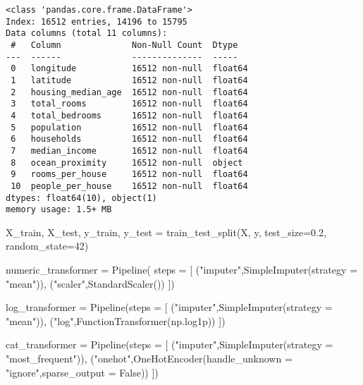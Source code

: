 \documentclass[
  letterpaper,
  DIV=11,
  numbers=noendperiod]{scrartcl}
\newenvironment{Shaded}{\begin{snugshade}}{\end{snugshade}}
\newcommand{\DecValTok}[1]{\textcolor[rgb]{0.68,0.00,0.00}{#1}}
\newcommand{\FloatTok}[1]{\textcolor[rgb]{0.68,0.00,0.00}{#1}}
\newcommand{\NormalTok}[1]{\textcolor[rgb]{0.00,0.23,0.31}{#1}}
\newcommand{\OperatorTok}[1]{\textcolor[rgb]{0.37,0.37,0.37}{#1}}
\newcommand{\StringTok}[1]{\textcolor[rgb]{0.13,0.47,0.30}{#1}}
\newcommand{\VariableTok}[1]{\textcolor[rgb]{0.07,0.07,0.07}{#1}}
\begin{document}
\begin{verbatim}
<class 'pandas.core.frame.DataFrame'>
Index: 16512 entries, 14196 to 15795
Data columns (total 11 columns):
 #   Column              Non-Null Count  Dtype  
---  ------              --------------  -----  
 0   longitude           16512 non-null  float64
 1   latitude            16512 non-null  float64
 2   housing_median_age  16512 non-null  float64
 3   total_rooms         16512 non-null  float64
 4   total_bedrooms      16512 non-null  float64
 5   population          16512 non-null  float64
 6   households          16512 non-null  float64
 7   median_income       16512 non-null  float64
 8   ocean_proximity     16512 non-null  object 
 9   rooms_per_house     16512 non-null  float64
 10  people_per_house    16512 non-null  float64
dtypes: float64(10), object(1)
memory usage: 1.5+ MB
\end{verbatim}

\begin{Shaded}
\begin{Highlighting}[]
\NormalTok{X\_train, X\_test, y\_train, y\_test }\OperatorTok{=}\NormalTok{ train\_test\_split(X, y, test\_size}\OperatorTok{=}\FloatTok{0.2}\NormalTok{, random\_state}\OperatorTok{=}\DecValTok{42}\NormalTok{)}
\end{Highlighting}
\end{Shaded}

\begin{Shaded}
\begin{Highlighting}[]
\NormalTok{numeric\_transformer }\OperatorTok{=}\NormalTok{ Pipeline( steps }\OperatorTok{=}\NormalTok{ [}
\NormalTok{    (}\StringTok{"imputer"}\NormalTok{,SimpleImputer(strategy }\OperatorTok{=} \StringTok{"mean"}\NormalTok{)),}
\NormalTok{    (}\StringTok{"scaler"}\NormalTok{,StandardScaler())}
\NormalTok{])}

\NormalTok{log\_transformer }\OperatorTok{=}\NormalTok{ Pipeline(steps }\OperatorTok{=}\NormalTok{ [}
\NormalTok{    (}\StringTok{"imputer"}\NormalTok{,SimpleImputer(strategy }\OperatorTok{=} \StringTok{"mean"}\NormalTok{)),}
\NormalTok{    (}\StringTok{"log"}\NormalTok{,FunctionTransformer(np.log1p))}
\NormalTok{])}

\NormalTok{cat\_transformer }\OperatorTok{=}\NormalTok{ Pipeline(steps }\OperatorTok{=}\NormalTok{ [}
\NormalTok{    (}\StringTok{"imputer"}\NormalTok{,SimpleImputer(strategy }\OperatorTok{=} \StringTok{"most\_frequent"}\NormalTok{)),}
\NormalTok{    (}\StringTok{"onehot"}\NormalTok{,OneHotEncoder(handle\_unknown }\OperatorTok{=} \StringTok{"ignore"}\NormalTok{,sparse\_output }\OperatorTok{=} \VariableTok{False}\NormalTok{))}
\NormalTok{])}
\end{Highlighting}
\end{Shaded}
\end{document}
